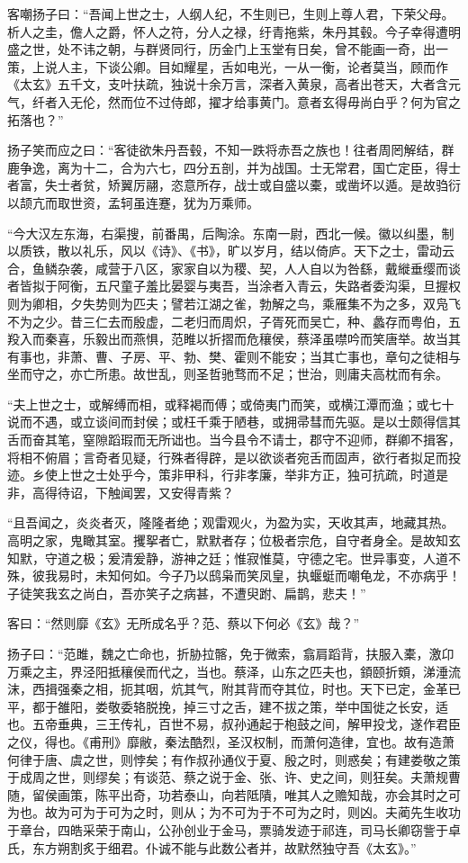 \documentclass[]{article}
\begin{document}
客嘲扬子曰：``吾闻上世之士，人纲人纪，不生则已，生则上尊人君，下荣父母。析人之圭，儋人之爵，怀人之符，分人之禄，纡青拖紫，朱丹其毂。今子幸得遭明盛之世，处不讳之朝，与群贤同行，历金门上玉堂有日矣，曾不能画一奇，出一策，上说人主，下谈公卿。目如耀星，舌如电光，一从一衡，论者莫当，顾而作《太玄》五千文，支叶扶疏，独说十余万言，深者入黄泉，高者出苍天，大者含元气，纤者入无伦，然而位不过侍郎，擢才给事黄门。意者玄得毋尚白乎？何为官之拓落也？''

扬子笑而应之曰：``客徒欲朱丹吾毂，不知一跌将赤吾之族也！往者周罔解结，群鹿争逸，离为十二，合为六七，四分五剖，并为战国。士无常君，国亡定臣，得士者富，失士者贫，矫翼厉翮，恣意所存，战士或自盛以橐，或凿坏以遁。是故驺衍以颉亢而取世资，孟轲虽连蹇，犹为万乘师。

``今大汉左东海，右渠搜，前番禺，后陶涂。东南一尉，西北一候。徽以纠墨，制以质铁，散以礼乐，风以《诗》、《书》，旷以岁月，结以倚庐。天下之士，雷动云合，鱼鳞杂袭，咸营于八区，家家自以为稷、契，人人自以为咎繇，戴縰垂缨而谈者皆拟于阿衡，五尺童子羞比晏婴与夷吾，当涂者入青云，失路者委沟渠，旦握权则为卿相，夕失势则为匹夫；譬若江湖之雀，勃解之鸟，乘雁集不为之多，双凫飞不为之少。昔三仁去而殷虚，二老归而周炽，子胥死而吴亡，种、蠡存而粤伯，五羖入而秦喜，乐毅出而燕惧，范睢以折摺而危穰侯，蔡泽虽噤吟而笑唐举。故当其有事也，非萧、曹、子房、平、勃、樊、霍则不能安；当其亡事也，章句之徒相与坐而守之，亦亡所患。故世乱，则圣哲驰骛而不足；世治，则庸夫高枕而有余。

``夫上世之士，或解缚而相，或释褐而傅；或倚夷门而笑，或横江潭而渔；或七十说而不遇，或立谈间而封侯；或枉千乘于陋巷，或拥帚彗而先驱。是以士颇得信其舌而奋其笔，窒隙蹈瑕而无所诎也。当今县令不请士，郡守不迎师，群卿不揖客，将相不俯眉；言奇者见疑，行殊者得辟，是以欲谈者宛舌而固声，欲行者拟足而投迹。乡使上世之士处乎今，策非甲科，行非孝廉，举非方正，独可抗疏，时道是非，高得待诏，下触闻罢，又安得青紫？

``且吾闻之，炎炎者灭，隆隆者绝；观雷观火，为盈为实，天收其声，地藏其热。高明之家，鬼瞰其室。攫挐者亡，默默者存；位极者宗危，自守者身全。是故知玄知默，守道之极；爰清爰静，游神之廷；惟寂惟莫，守德之宅。世异事变，人道不殊，彼我易时，未知何如。今子乃以鸱枭而笑凤皇，执蝘蜓而嘲龟龙，不亦病乎！子徒笑我玄之尚白，吾亦笑子之病甚，不遭臾跗、扁鹊，悲夫！''

客曰：``然则靡《玄》无所成名乎？范、蔡以下何必《玄》哉？''

扬子曰：``范雎，魏之亡命也，折胁拉髂，免于微索，翕肩蹈背，扶服入橐，激卬万乘之主，界泾阳抵穰侯而代之，当也。蔡泽，山东之匹夫也，顉颐折頞，涕涶流沫，西揖强秦之相，扼其咽，炕其气，附其背而夺其位，时也。天下已定，金革已平，都于雒阳，娄敬委辂脱挽，掉三寸之舌，建不拔之策，举中国徙之长安，适也。五帝垂典，三王传礼，百世不易，叔孙通起于枹鼓之间，解甲投戈，遂作君臣之仪，得也。《甫刑》靡敝，秦法酷烈，圣汉权制，而萧何造律，宜也。故有造萧何律于唐、虞之世，则悖矣；有作叔孙通仪于夏、殷之时，则惑矣；有建娄敬之策于成周之世，则缪矣；有谈范、蔡之说于金、张、许、史之间，则狂矣。夫萧规曹随，留侯画策，陈平出奇，功若泰山，向若阺隤，唯其人之赡知哉，亦会其时之可为也。故为可为于可为之时，则从；为不可为于不可为之时，则凶。夫蔺先生收功于章台，四皓采荣于南山，公孙创业于金马，票骑发迹于祁连，司马长卿窃訾于卓氏，东方朔割炙于细君。仆诚不能与此数公者并，故默然独守吾《太玄》。''
\end{document}
